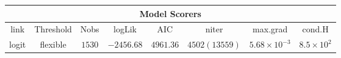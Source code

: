 
\begin{minipage}{\linewidth}
\begin{tabular}{|c|c|c|c|c|c|c|c|}
\hline
\multicolumn{8}{|c|}{Model Scorers}\\\hline
link  &  Threshold & Nobs & logLik & AIC & niter & max.grad & cond.H\\\hline
logit & flexible & $1530$ & $-2456.68$ & $4961.36$ & $4502(13559)$ & $5.68\times 10^{-3}$ & $8.5\times 10^{2}$\\\hline
\end{tabular}
\label{tab:modrand}
\end{minipage}
\newline
\newline
\newline
\newline
